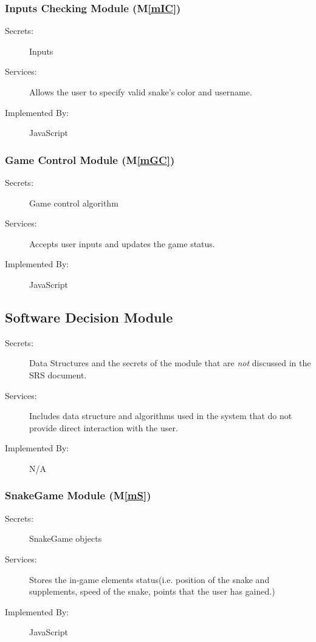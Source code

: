 \documentclass[12pt, titlepage]{article}
\newcommand{\mref}[1]{M\ref{#1}}
\begin{document}
\subsubsection{Inputs Checking Module (\mref{mIC})}
\begin{description}
\item[Secrets:] Inputs
\item[Services:] Allows the user to specify valid snake's color and username.
\item[Implemented By:] JavaScript
\end{description}

\subsubsection{Game Control Module (\mref{mGC})}
\begin{description}
\item[Secrets:] Game control algorithm
\item[Services:] Accepts user inputs and updates the game status.
\item[Implemented By:]JavaScript
\end{description}


\subsection{Software Decision Module}
\begin{description}
\item[Secrets:] Data Structures and the secrets of the module that are \emph{not} discussed in the SRS document.
\item[Services:] Includes data structure and algorithms used in the system that
  do not provide direct interaction with the user. 
\item[Implemented By:] N/A
\end{description}

\subsubsection{SnakeGame Module (\mref{mS})}
\begin{description}
\item[Secrets:]SnakeGame objects
\item[Services:]Stores the in-game elements status(i.e. position of the snake and supplements, speed of the snake, points that the user has gained.)
\item[Implemented By:]JavaScript
\end{description}
\end{document}
